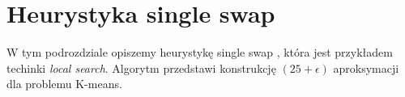 \section{Heurystyka single swap}

W tym podrozdziale opiszemy heurystykę single swap \cite{Arya2004LocalSH}, która jest przykładem techinki \textit{local search}.
Algorytm przedstawi konstrukcję $(25 + \epsilon)$ aproksymacji dla problemu K-means.



